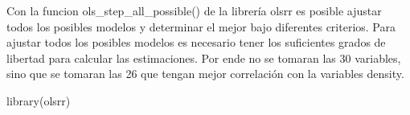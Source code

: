 \documentclass[
]{article}
\newenvironment{Shaded}{\begin{snugshade}}{\end{snugshade}}
\newcommand{\FunctionTok}[1]{\textcolor[rgb]{0.00,0.00,0.00}{#1}}
\newcommand{\NormalTok}[1]{#1}
\begin{document}
Con la funcion ols\_step\_all\_possible() de la librería olsrr es
posible ajustar todos los posibles modelos y determinar el mejor bajo
diferentes criterios. Para ajustar todos los posibles modelos es
necesario tener los suficientes grados de libertad para calcular las
estimaciones. Por ende no se tomaran las 30 variables, sino que se
tomaran las 26 que tengan mejor correlación con la variables density.

\begin{Shaded}
\begin{Highlighting}[]
\FunctionTok{library}\NormalTok{(olsrr)}
\end{Highlighting}
\end{Shaded}
\end{document}
